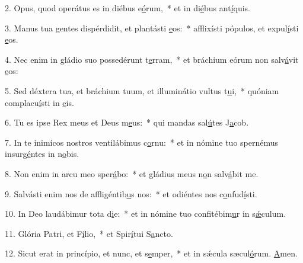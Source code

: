 2. Opus, quod operátus es in diébus e\uline{ó}rum,~* et in di\uline{é}bus ant\uline{í}quis.\par 
3. Manus tua gentes dispérdidit, et plantásti \uline{e}os:~* afflixísti pópulos, et expul\uline{í}sti \uline{e}os.\par 
4. Nec enim in gládio suo possedérunt t\uline{e}rram,~* et bráchium eórum non salv\uline{á}vit \uline{e}os:\par 
5. Sed déxtera tua, et bráchium tuum, et illuminátio vultus t\uline{u}i,~* quóniam complacu\uline{í}sti in \uline{e}is.\par 
6. Tu es ipse Rex meus et Deus m\uline{e}us:~* qui mandas sal\uline{ú}tes J\uline{a}cob.\par 
7. In te inimícos nostros ventilábimus c\uline{o}rnu:~* et in nómine tuo spernémus insurg\uline{é}ntes in n\uline{o}bis.\par 
8. Non enim in arcu meo sper\uline{á}bo:~* et gládius meus n\uline{o}n salv\uline{á}bit me.\par 
9. Salvásti enim nos de affligéntib\uline{u}s nos:~* et odiéntes nos c\uline{o}nfud\uline{í}sti.\par 
10. In Deo laudábimur tota d\uline{i}e:~* et in nómine tuo confitébim\uline{u}r in s\uline{ǽ}culum.\par 
11. Glória Patri, et F\uline{í}lio,~* et Spir\uline{í}tui S\uline{a}ncto.\par 
12. Sicut erat in princípio, et nunc, et s\uline{e}mper,~* et in sǽcula sæcul\uline{ó}rum. \uline{A}men.\par 

